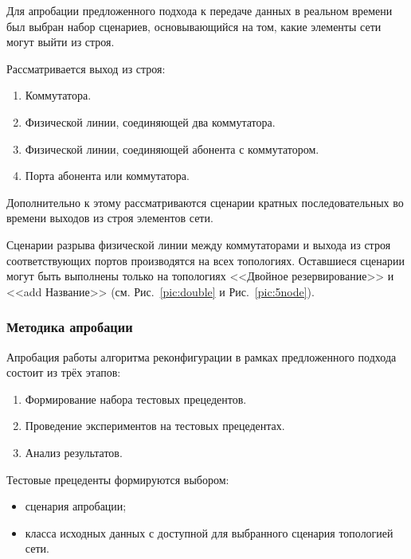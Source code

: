 \documentclass[12pt,fleqn]{article}
\begin{document}
Для апробации предложенного подхода к передаче данных в реальном времени был выбран набор сценариев, основывающийся на том, какие элементы сети могут выйти из строя. 

Рассматривается выход из строя:
\begin{enumerate}
	\item Коммутатора.
	\item Физической линии, соединяющей два коммутатора.
	\item Физической линии, соединяющей абонента с коммутатором.
	\item Порта абонента или коммутатора.
\end{enumerate}

Дополнительно к этому рассматриваются сценарии кратных последовательных во времени выходов из строя элементов сети.

Сценарии разрыва физической линии между коммутаторами и выхода из строя соответствующих портов производятся на всех топологиях. Оставшиеся сценарии могут быть выполнены только на топологиях <<Двойное резервирование>> и <<add Название>> (см. Рис.~\ref{pic:double} и Рис.~\ref{pic:5node}).

\subsubsection{Методика апробации}
Апробация работы алгоритма реконфигурации в рамках предложенного подхода состоит из трёх этапов:
\begin{enumerate}
	\item Формирование набора тестовых прецедентов.
	\item Проведение экспериментов на тестовых прецедентах.
	\item Анализ результатов.
\end{enumerate}

Тестовые прецеденты формируются выбором:
\begin{itemize}
	\item сценария апробации;
	\item класса исходных данных с доступной для выбранного сценария топологией сети.
\end{itemize}
\end{document}
